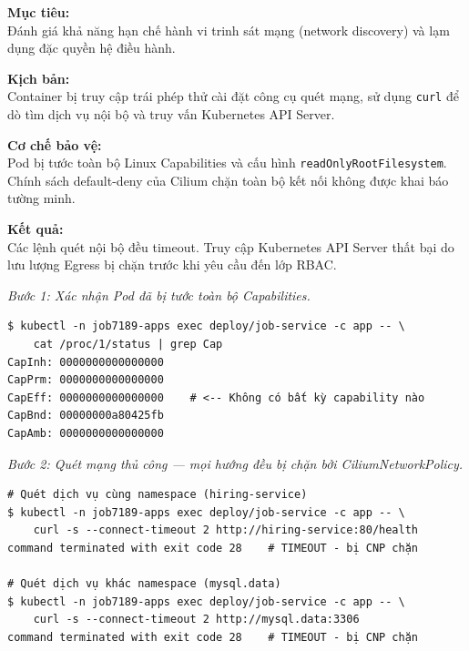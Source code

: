\textbf{Mục tiêu:}\\
Đánh giá khả năng hạn chế hành vi trinh sát mạng (network discovery) và lạm dụng đặc quyền hệ điều hành.

\textbf{Kịch bản:}\\
Container bị truy cập trái phép thử cài đặt công cụ quét mạng, sử dụng \texttt{curl} để dò tìm dịch vụ nội bộ và truy vấn Kubernetes API Server.

\textbf{Cơ chế bảo vệ:}\\
Pod bị tước toàn bộ Linux Capabilities và cấu hình \texttt{readOnlyRootFilesystem}. Chính sách default-deny của Cilium chặn toàn bộ kết nối không được khai báo tường minh.

\textbf{Kết quả:}\\
Các lệnh quét nội bộ đều timeout. Truy cập Kubernetes API Server thất bại do lưu lượng Egress bị chặn trước khi yêu cầu đến lớp RBAC.



\textit{Bước 1: Xác nhận Pod đã bị tước toàn bộ Capabilities.}
\begin{listing}[H]
\caption{Kiểm tra Capabilities thực tế --- CapEff = 0 nghĩa là không còn đặc quyền nào}
\label{lst:kb8_capeff}
\begin{verbatim}
$ kubectl -n job7189-apps exec deploy/job-service -c app -- \
    cat /proc/1/status | grep Cap
CapInh: 0000000000000000
CapPrm: 0000000000000000
CapEff: 0000000000000000    # <-- Không có bất kỳ capability nào
CapBnd: 00000000a80425fb
CapAmb: 0000000000000000
\end{verbatim}
\end{listing}

\textit{Bước 2: Quét mạng thủ công --- mọi hướng đều bị chặn bởi CiliumNetworkPolicy.}
\begin{listing}[H]
\caption{Curl trinh sát đa hướng: cùng namespace, xuyên namespace --- tất cả đều timeout}
\label{lst:kb8_scan_cmd}
\begin{verbatim}
# Quét dịch vụ cùng namespace (hiring-service)
$ kubectl -n job7189-apps exec deploy/job-service -c app -- \
    curl -s --connect-timeout 2 http://hiring-service:80/health
command terminated with exit code 28    # TIMEOUT - bị CNP chặn

# Quét dịch vụ khác namespace (mysql.data)
$ kubectl -n job7189-apps exec deploy/job-service -c app -- \
    curl -s --connect-timeout 2 http://mysql.data:3306
command terminated with exit code 28    # TIMEOUT - bị CNP chặn
\end{verbatim}
\end{listing}

